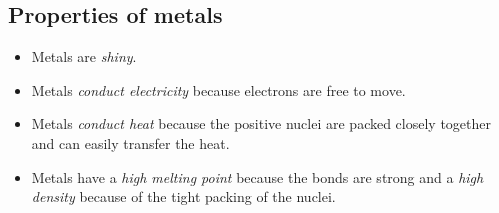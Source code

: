 \subsection*{Properties of metals}
\begin{itemize}
 \item Metals are \textsl{shiny}.
\item Metals \textsl{conduct electricity} because electrons are free to move.
\item Metals \textsl{conduct heat} because the positive nuclei are packed closely together and can easily transfer the heat.
\item Metals have a \textsl{high melting point} because the bonds are strong and a \textsl{high density} because of the tight packing of the nuclei.
\end{itemize}

